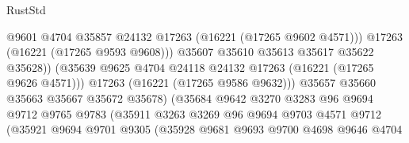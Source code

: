\begin{lexlean}{RustStd}
\begin{coremodule}
                                            @9601
                                            @4704
                                            @35857
                                            @24132
                                            @17263
                                            (@16221 (@17265 @9602 @4571)))
                                          @17263
                                          (@16221 (@17265 @9593 @9608)))
                                        @35607
                                        @35610
                                        @35613
                                        @35617
                                        @35622
                                        @35628))
                                    (@35639
                                      @9625
                                      @4704
                                      @24118
                                      @24132
                                      @17263
                                      (@16221 (@17265 @9626 @4571)))
                                    @17263
                                    (@16221 (@17265 @9586 @9632)))
                                  @35657
                                  @35660
                                  @35663
                                  @35667
                                  @35672
                                  @35678)
                                (@35684
                                  @9642
                                  @3270
                                  @3283
                                  @96
                                  @9694
                                  @9712
                                  @9765
                                  @9783
                                  (@35911
                                    @3263
                                    @3269
                                    @96
                                    @9694
                                    @9703
                                    @4571
                                    @9712
                                    (@35921
                                      @9694
                                      @9701
                                      @9305
                                      (@35928
                                        @9681
                                        @9693
                                        @9700
                                        @4698
                                        @9646
                                        @4704

\end{coremodule}
\end{lexlean}
